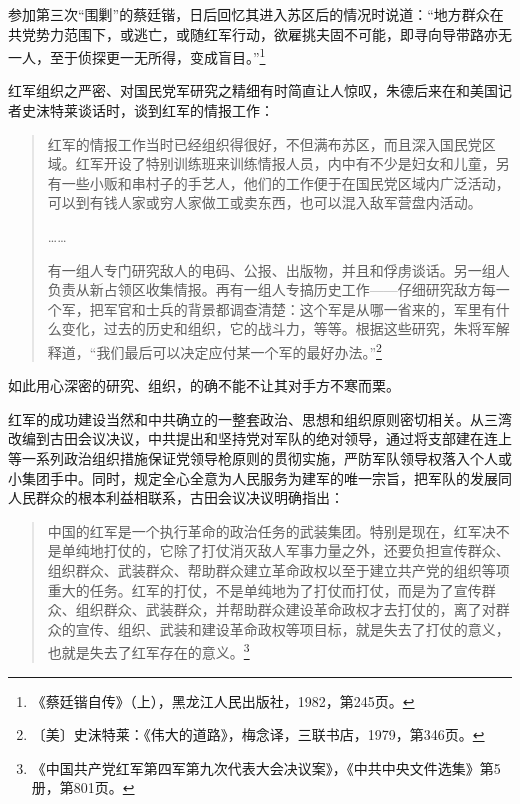 参加第三次“围剿”的蔡廷锴，日后回忆其进入苏区后的情况时说道：“地方群众在共党势力范围下，或逃亡，或随红军行动，欲雇挑夫固不可能，即寻向导带路亦无一人，至于侦探更一无所得，变成盲目。”\footnote{《蔡廷锴自传》（上），黑龙江人民出版社，1982，第245页。}


红军组织之严密、对国民党军研究之精细有时简直让人惊叹，朱德后来在和美国记者史沫特莱谈话时，谈到红军的情报工作：

\begin{quote}

红军的情报工作当时已经组织得很好，不但满布苏区，而且深入国民党区域。红军开设了特别训练班来训练情报人员，内中有不少是妇女和儿童，另有一些小贩和串村子的手艺人，他们的工作便于在国民党区域内广泛活动，可以到有钱人家或穷人家做工或卖东西，也可以混入敌军营盘内活动。

……

有一组人专门研究敌人的电码、公报、出版物，并且和俘虏谈话。另一组人负责从新占领区收集情报。再有一组人专搞历史工作——仔细研究敌方每一个军，把军官和士兵的背景都调查清楚：这个军是从哪一省来的，军里有什么变化，过去的历史和组织，它的战斗力，等等。根据这些研究，朱将军解释道，“我们最后可以决定应付某一个军的最好办法。”\footnote{〔美〕史沫特莱：《伟大的道路》，梅念译，三联书店，1979，第346页。}
\end{quote}


如此用心深密的研究、组织，的确不能不让其对手方不寒而栗。


红军的成功建设当然和中共确立的一整套政治、思想和组织原则密切相关。从三湾改编到古田会议决议，中共提出和坚持党对军队的绝对领导，通过将支部建在连上等一系列政治组织措施保证党领导枪原则的贯彻实施，严防军队领导权落入个人或小集团手中。同时，规定全心全意为人民服务为建军的唯一宗旨，把军队的发展同人民群众的根本利益相联系，古田会议决议明确指出：

\begin{quote}

中国的红军是一个执行革命的政治任务的武装集团。特别是现在，红军决不是单纯地打仗的，它除了打仗消灭敌人军事力量之外，还要负担宣传群众、组织群众、武装群众、帮助群众建立革命政权以至于建立共产党的组织等项重大的任务。红军的打仗，不是单纯地为了打仗而打仗，而是为了宣传群众、组织群众、武装群众，并帮助群众建设革命政权才去打仗的，离了对群众的宣传、组织、武装和建设革命政权等项目标，就是失去了打仗的意义，也就是失去了红军存在的意义。\footnote{《中国共产党红军第四军第九次代表大会决议案》，《中共中央文件选集》第5册，第801页。}
\end{quote}


